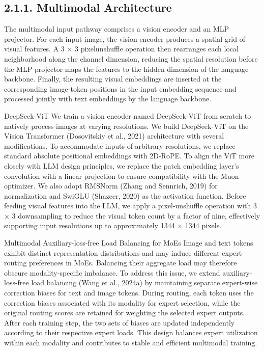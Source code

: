 \documentclass[
  10
]{article}
\begin{document}
\subsection{2.1.1. Multimodal
Architecture}\label{multimodal-architecture}

The multimodal input pathway comprises a vision encoder and an MLP
projector. For each input image, the vision encoder produces a spatial
grid of visual features. A 3 × 3 pixelunshuffle operation then
rearranges each local neighborhood along the channel dimension, reducing
the spatial resolution before the MLP projector maps the features to the
hidden dimension of the language backbone. Finally, the resulting visual
embeddings are inserted at the corresponding image-token positions in
the input embedding sequence and processed jointly with text embeddings
by the language backbone.

DeepSeek-ViT We train a vision encoder named DeepSeek-ViT from scratch
to natively process images at varying resolutions. We build DeepSeek-ViT
on the Vision Transformer (Dosovitskiy et al., 2021) architecture with
several modifications. To accommodate inputs of arbitrary resolutions,
we replace standard absolute positional embeddings with 2D-RoPE. To
align the ViT more closely with LLM design principles, we replace the
patch embedding layer's convolution with a linear projection to ensure
compatibility with the Muon optimizer. We also adopt RMSNorm (Zhang and
Sennrich, 2019) for normalization and SwiGLU (Shazeer, 2020) as the
activation function. Before feeding visual features into the LLM, we
apply a pixel-unshuffle operation with 3 × 3 downsampling to reduce the
visual token count by a factor of nine, effectively supporting input
resolutions up to approximately 1344 × 1344 pixels.

Multimodal Auxiliary-loss-free Load Balancing for MoEs Image and text
tokens exhibit distinct representation distributions and may induce
different expert-routing preferences in MoEs. Balancing their aggregate
load may therefore obscure modality-specific imbalance. To address this
issue, we extend auxiliary-loss-free load balancing (Wang et al., 2024a)
by maintaining separate expert-wise correction biases for text and image
tokens. During routing, each token uses the correction biases associated
with its modality for expert selection, while the original routing
scores are retained for weighting the selected expert outputs. After
each training step, the two sets of biases are updated independently
according to their respective expert loads. This design balances expert
utilization within each modality and contributes to stable and efficient
multimodal training.
\end{document}
